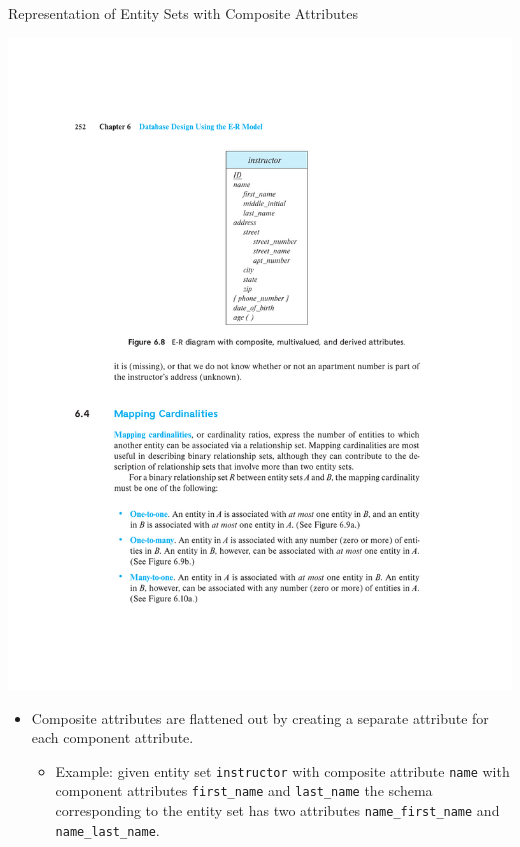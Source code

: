 \documentclass{beamer}
\begin{document}
\begin{frame}{Representation of Entity Sets with Composite Attributes}
    \begin{minipage}{0.25\textwidth}
        \includegraphics[trim={9.25cm 15.25cm 8.5cm 4cm}, clip, width=\textwidth]{figures/p252}
    \end{minipage}%
    \begin{minipage}{0.74\textwidth}
        \begin{itemize}
            \scriptsize
            \item Composite attributes are flattened out by creating a separate attribute for each component attribute.
            \begin{itemize}
                \scriptsize
                \item Example: given entity set \texttt{instructor} with composite attribute \texttt{name} with component attributes \texttt{first\_name} and \texttt{last\_name} the schema corresponding to the entity set has two attributes \texttt{name\_first\_name} and \texttt{name\_last\_name}.

\end{itemize}
\end{itemize}
\end{minipage}
\end{frame}
\end{document}
